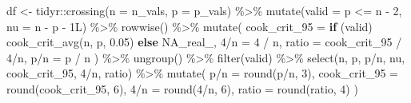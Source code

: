 \documentclass[
  letterpaper,
  DIV=11,
  numbers=noendperiod]{scrreprt}
\newenvironment{Shaded}{\begin{snugshade}}{\end{snugshade}}
\newcommand{\AttributeTok}[1]{\textcolor[rgb]{0.40,0.45,0.13}{#1}}
\newcommand{\ConstantTok}[1]{\textcolor[rgb]{0.56,0.35,0.01}{#1}}
\newcommand{\ControlFlowTok}[1]{\textcolor[rgb]{0.00,0.23,0.31}{\textbf{#1}}}
\newcommand{\DecValTok}[1]{\textcolor[rgb]{0.68,0.00,0.00}{#1}}
\newcommand{\FloatTok}[1]{\textcolor[rgb]{0.68,0.00,0.00}{#1}}
\newcommand{\FunctionTok}[1]{\textcolor[rgb]{0.28,0.35,0.67}{#1}}
\newcommand{\NormalTok}[1]{\textcolor[rgb]{0.00,0.23,0.31}{#1}}
\newcommand{\OtherTok}[1]{\textcolor[rgb]{0.00,0.23,0.31}{#1}}
\newcommand{\SpecialCharTok}[1]{\textcolor[rgb]{0.37,0.37,0.37}{#1}}
\newcommand{\StringTok}[1]{\textcolor[rgb]{0.13,0.47,0.30}{#1}}
\begin{document}
\begin{Shaded}
\begin{Highlighting}[]
\NormalTok{df }\OtherTok{\textless{}{-}}\NormalTok{ tidyr}\SpecialCharTok{::}\FunctionTok{crossing}\NormalTok{(}\AttributeTok{n =}\NormalTok{ n\_vals, }\AttributeTok{p =}\NormalTok{ p\_vals) }\SpecialCharTok{\%\textgreater{}\%}
  \FunctionTok{mutate}\NormalTok{(}\AttributeTok{valid =}\NormalTok{ p }\SpecialCharTok{\textless{}=}\NormalTok{ n }\SpecialCharTok{{-}} \DecValTok{2}\NormalTok{,}
         \AttributeTok{nu    =}\NormalTok{ n }\SpecialCharTok{{-}}\NormalTok{ p }\SpecialCharTok{{-}} \DecValTok{1}\NormalTok{L) }\SpecialCharTok{\%\textgreater{}\%}
  \FunctionTok{rowwise}\NormalTok{() }\SpecialCharTok{\%\textgreater{}\%}
  \FunctionTok{mutate}\NormalTok{(}
    \AttributeTok{cook\_crit\_95 =} \ControlFlowTok{if}\NormalTok{ (valid) }\FunctionTok{cook\_crit\_avg}\NormalTok{(n, p, }\FloatTok{0.05}\NormalTok{) }\ControlFlowTok{else} \ConstantTok{NA\_real\_}\NormalTok{,}
    \StringTok{\textasciigrave{}}\AttributeTok{4/n}\StringTok{\textasciigrave{}}        \OtherTok{=} \DecValTok{4} \SpecialCharTok{/}\NormalTok{ n,}
    \AttributeTok{ratio        =}\NormalTok{ cook\_crit\_95 }\SpecialCharTok{/} \StringTok{\textasciigrave{}}\AttributeTok{4/n}\StringTok{\textasciigrave{}}\NormalTok{,}
    \StringTok{\textasciigrave{}}\AttributeTok{p/n}\StringTok{\textasciigrave{}}        \OtherTok{=}\NormalTok{ p }\SpecialCharTok{/}\NormalTok{ n}
\NormalTok{  ) }\SpecialCharTok{\%\textgreater{}\%}
  \FunctionTok{ungroup}\NormalTok{() }\SpecialCharTok{\%\textgreater{}\%}
  \FunctionTok{filter}\NormalTok{(valid) }\SpecialCharTok{\%\textgreater{}\%}
  \FunctionTok{select}\NormalTok{(n, p, }\StringTok{\textasciigrave{}}\AttributeTok{p/n}\StringTok{\textasciigrave{}}\NormalTok{, nu, cook\_crit\_95, }\StringTok{\textasciigrave{}}\AttributeTok{4/n}\StringTok{\textasciigrave{}}\NormalTok{, ratio) }\SpecialCharTok{\%\textgreater{}\%}
  \FunctionTok{mutate}\NormalTok{(}
    \StringTok{\textasciigrave{}}\AttributeTok{p/n}\StringTok{\textasciigrave{}}         \OtherTok{=} \FunctionTok{round}\NormalTok{(}\StringTok{\textasciigrave{}}\AttributeTok{p/n}\StringTok{\textasciigrave{}}\NormalTok{, }\DecValTok{3}\NormalTok{),}
    \AttributeTok{cook\_crit\_95  =} \FunctionTok{round}\NormalTok{(cook\_crit\_95, }\DecValTok{6}\NormalTok{),}
    \StringTok{\textasciigrave{}}\AttributeTok{4/n}\StringTok{\textasciigrave{}}         \OtherTok{=} \FunctionTok{round}\NormalTok{(}\StringTok{\textasciigrave{}}\AttributeTok{4/n}\StringTok{\textasciigrave{}}\NormalTok{, }\DecValTok{6}\NormalTok{),}
    \AttributeTok{ratio         =} \FunctionTok{round}\NormalTok{(ratio, }\DecValTok{4}\NormalTok{)}
\NormalTok{  )}



\end{Highlighting}
\end{Shaded}
\end{document}
